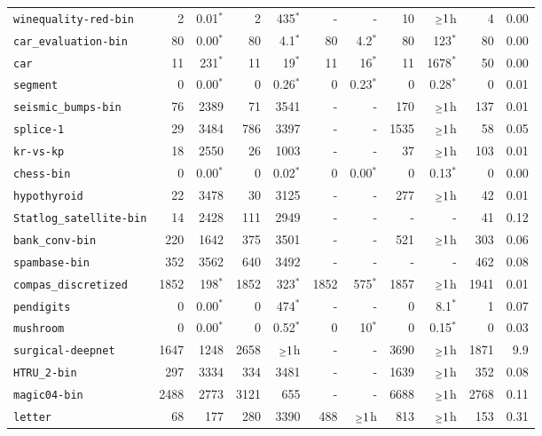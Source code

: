 \begin{tabular}{lrrrrrrrrrr}
\texttt{winequality-red-bin} & 2 & 0.01$^*$ & 2 & 435$^*$ & - & - & 10 & $\mathsmaller{\geq}1$h & 4 & 0.00\\
\texttt{car\_evaluation-bin} & 80 & 0.00$^*$ & 80 & 4.1$^*$ & 80 & 4.2$^*$ & 80 & 123$^*$ & 80 & 0.00\\
\texttt{car} & 11 & 231$^*$ & 11 & 19$^*$ & 11 & 16$^*$ & 11 & 1678$^*$ & 50 & 0.00\\
\texttt{segment} & 0 & 0.00$^*$ & 0 & 0.26$^*$ & 0 & 0.23$^*$ & 0 & 0.28$^*$ & 0 & 0.01\\
\texttt{seismic\_bumps-bin} & 76 & 2389 & 71 & 3541 & - & - & 170 & $\mathsmaller{\geq}1$h & 137 & 0.01\\
\texttt{splice-1} & 29 & 3484 & 786 & 3397 & - & - & 1535 & $\mathsmaller{\geq}1$h & 58 & 0.05\\
\texttt{kr-vs-kp} & 18 & 2550 & 26 & 1003 & - & - & 37 & $\mathsmaller{\geq}1$h & 103 & 0.01\\
\texttt{chess-bin} & 0 & 0.00$^*$ & 0 & 0.02$^*$ & 0 & 0.00$^*$ & 0 & 0.13$^*$ & 0 & 0.00\\
\texttt{hypothyroid} & 22 & 3478 & 30 & 3125 & - & - & 277 & $\mathsmaller{\geq}1$h & 42 & 0.01\\
\texttt{Statlog\_satellite-bin} & 14 & 2428 & 111 & 2949 & - & - & - & - & 41 & 0.12\\
\texttt{bank\_conv-bin} & 220 & 1642 & 375 & 3501 & - & - & 521 & $\mathsmaller{\geq}1$h & 303 & 0.06\\
\texttt{spambase-bin} & 352 & 3562 & 640 & 3492 & - & - & - & - & 462 & 0.08\\
\texttt{compas\_discretized} & 1852 & 198$^*$ & 1852 & 323$^*$ & 1852 & 575$^*$ & 1857 & $\mathsmaller{\geq}1$h & 1941 & 0.01\\
\texttt{pendigits} & 0 & 0.00$^*$ & 0 & 474$^*$ & - & - & 0 & 8.1$^*$ & 1 & 0.07\\
\texttt{mushroom} & 0 & 0.00$^*$ & 0 & 0.52$^*$ & 0 & 10$^*$ & 0 & 0.15$^*$ & 0 & 0.03\\
\texttt{surgical-deepnet} & 1647 & 1248 & 2658 & $\mathsmaller{\geq}1$h & - & - & 3690 & $\mathsmaller{\geq}1$h & 1871 & 9.9\\
\texttt{HTRU\_2-bin} & 297 & 3334 & 334 & 3481 & - & - & 1639 & $\mathsmaller{\geq}1$h & 352 & 0.08\\
\texttt{magic04-bin} & 2488 & 2773 & 3121 & 655 & - & - & 6688 & $\mathsmaller{\geq}1$h & 2768 & 0.11\\
\texttt{letter} & 68 & 177 & 280 & 3390 & 488 & $\mathsmaller{\geq}1$h & 813 & $\mathsmaller{\geq}1$h & 153 & 0.31\\

\end{tabular}
